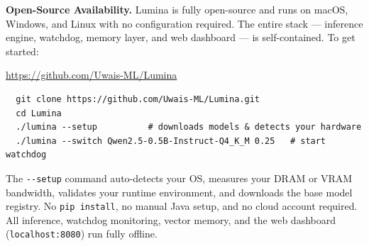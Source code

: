 \documentclass[11pt,a4paper]{article}
\newcommand{\code}[1]{\texttt{#1}}
\begin{document}
\medskip\noindent\textbf{Open-Source Availability.} Lumina is fully open-source and runs on macOS, Windows, and Linux with no configuration required. The entire stack --- inference engine, watchdog, memory layer, and web dashboard --- is self-contained. To get started:
\begin{center}
\url{https://github.com/Uwais-ML/Lumina}
\end{center}
\vspace{-2pt}
\begin{verbatim}
  git clone https://github.com/Uwais-ML/Lumina.git
  cd Lumina
  ./lumina --setup          # downloads models & detects your hardware
  ./lumina --switch Qwen2.5-0.5B-Instruct-Q4_K_M 0.25   # start watchdog
\end{verbatim}
\vspace{-4pt}
\noindent The \code{{-}{-}setup} command auto-detects your OS, measures your DRAM or VRAM bandwidth, validates your runtime environment, and downloads the base model registry. No \code{pip install}, no manual Java setup, and no cloud account required. All inference, watchdog monitoring, vector memory, and the web dashboard (\code{localhost:8080}) run fully offline.

\end{document}
